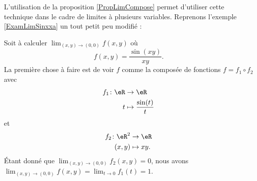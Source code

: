 L'utilisation de la proposition \ref{PropLimCompose} permet d'utiliser cette technique dans le cadre de limites à plusieurs variables. Reprenons l'exemple \ref{ExamLimSinxxa} un tout petit peu modifié :

\begin{example}
	Soit à calculer $\lim_{(x,y)\to(0,0)}f(x,y)$ où
	\begin{equation}
		f(x,y)=\frac{ \sin(xy) }{ xy }.
	\end{equation}
	La première chose à faire est de voir $f$ comme la composée de fonctions $f=f_1\circ f_2$ avec
	\begin{equation}
		\begin{aligned}
			f_1\colon \eR&\to \eR \\
			t&\mapsto \frac{ \sin(t) }{ t } 
		\end{aligned}
	\end{equation}
	et
	\begin{equation}
		\begin{aligned}
			f_2\colon \eR^2&\to \eR \\
			(x,y)&\mapsto xy. 
		\end{aligned}
	\end{equation}
	 Étant donné que $\lim_{(x,y)\to(0,0)}f_2(x,y)=0$, nous avons $\lim_{(x,y)\to(0,0)}f(x,y)=\lim_{t\to 0} f_1(t)=1$.
\end{example}

